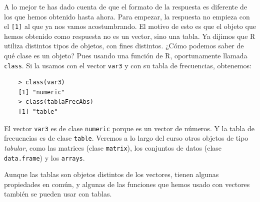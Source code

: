 \documentclass[10pt,a4paper]{article}\usepackage[]{graphicx}\usepackage[]{color}
\begin{document}
A lo mejor te has dado cuenta de que el formato de la respuesta es diferente de los que hemos obtenido hasta ahora. Para empezar, la respuesta no empieza con el {\tt [1]} al que  ya nos vamos acostumbrando. El motivo de esto es que el objeto que hemos obtenido como respuesta no es un vector, sino una tabla. Ya dijimos que R utiliza distintos tipos de objetos, con fines distintos. ¿Cómo podemos saber de qué clase es un objeto? Pues usando una función de R, oportunamente llamada {\tt class}. Si la usamos con el vector {\tt var3} y con su tabla de frecuencias, obtenemos:
    \begin{verbatim}
    > class(var3)
    [1] "numeric"
    > class(tablaFrecAbs)
    [1] "table"
    \end{verbatim}
El vector {\tt var3} es de clase {\tt numeric} porque es un vector de números. Y la tabla de frecuencias es de clase {\tt table}. Veremos a lo largo del curso otros objetos de tipo {\em tabular}, como las matrices (clase {\tt matrix}), los conjuntos de datos (clase {\tt data.frame}) y los {\tt arrays}.

Aunque las tablas son objetos distintos de los vectores, tienen algunas propiedades en común, y algunas de las funciones que hemos usado con vectores también se pueden usar con tablas.
\end{document}
